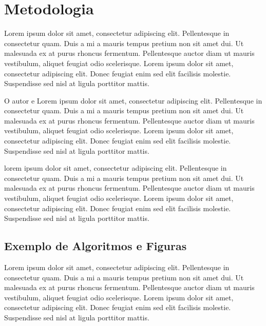 \chapter{Metodologia}
\label{chap:metodologia}

Lorem ipsum dolor sit amet, consectetur adipiscing elit. Pellentesque in consectetur quam. Duis a mi a mauris tempus pretium non sit amet dui. Ut malesuada ex at purus rhoncus fermentum. Pellentesque auctor diam ut mauris vestibulum, aliquet feugiat odio scelerisque. Lorem ipsum dolor sit amet, consectetur adipiscing elit. Donec feugiat enim sed elit facilisis molestie. Suspendisse sed nisl at ligula porttitor mattis.

O autor \cite{lamport1986latex} e \cite{Maia2011} Lorem ipsum dolor sit amet, consectetur adipiscing elit. Pellentesque in consectetur quam. Duis a mi a mauris tempus pretium non sit amet dui. Ut malesuada ex at purus rhoncus fermentum. Pellentesque auctor diam ut mauris vestibulum, aliquet feugiat odio scelerisque. Lorem ipsum dolor sit amet, consectetur adipiscing elit. Donec feugiat enim sed elit facilisis molestie. Suspendisse sed nisl at ligula porttitor mattis.

\cite{Huetal2000} lorem ipsum dolor sit amet, consectetur adipiscing elit. Pellentesque in consectetur quam. Duis a mi a mauris tempus pretium non sit amet dui. Ut malesuada ex at purus rhoncus fermentum. Pellentesque auctor diam ut mauris vestibulum, aliquet feugiat odio scelerisque. Lorem ipsum dolor sit amet, consectetur adipiscing elit. Donec feugiat enim sed elit facilisis molestie. Suspendisse sed nisl at ligula porttitor mattis.

\section{Exemplo de Algoritmos e Figuras}
\label{sec:exemplo-de-algoritmos-e-figuras}

Lorem ipsum dolor sit amet, consectetur adipiscing elit. Pellentesque in consectetur quam. Duis a mi a mauris tempus pretium non sit amet dui. Ut malesuada ex at purus rhoncus fermentum. Pellentesque auctor diam ut mauris vestibulum, aliquet feugiat odio scelerisque. Lorem ipsum dolor sit amet, consectetur adipiscing elit. Donec feugiat enim sed elit facilisis molestie. Suspendisse sed nisl at ligula porttitor mattis.

\begin{figure}[h!]
    \centering
\end{figure}

